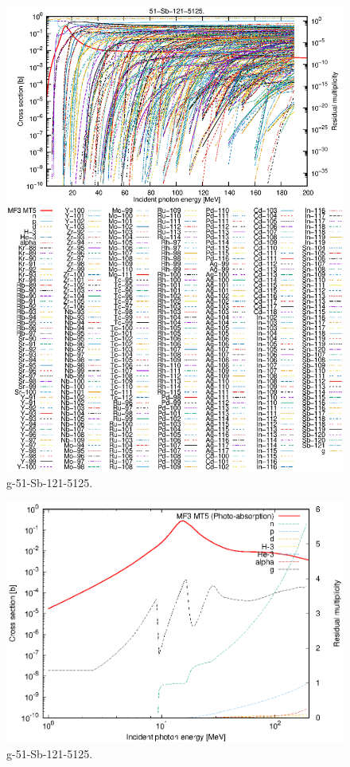 \begin{figure}
 \includegraphics[width=\linewidth]{eps/g_51-Sb-121_5125.eps}
  \caption{g-51-Sb-121-5125.}
\end{figure}
\newpage \clearpage

\begin{figure}
 \includegraphics[width=\linewidth]{eps-log/g_51-Sb-121_5125.eps}
 \caption{g-51-Sb-121-5125.}
\end{figure}
\newpage \clearpage

